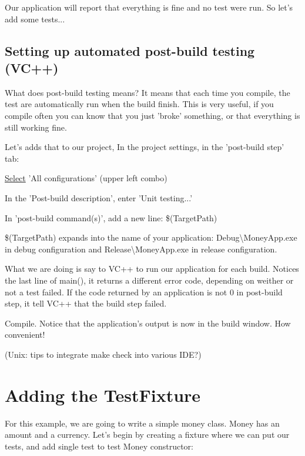 Our application will report that everything is fine and no test were run. So let's add some tests...\hypertarget{money_example_sec_post_build}{}\subsection{Setting up automated post-\/build testing (\+V\+C++)}\label{money_example_sec_post_build}
What does post-\/build testing means? It means that each time you compile, the test are automatically run when the build finish. This is very useful, if you compile often you can know that you just 'broke' something, or that everything is still working fine.

Let's adds that to our project, In the project settings, in the 'post-\/build step' tab\+:
\begin{DoxyItemize}
\item \hyperlink{struct_select}{Select} 'All configurations' (upper left combo)
\item In the 'Post-\/build description', enter 'Unit testing...'
\item In 'post-\/build command(s)', add a new line\+: {\ttfamily \$(Target\+Path)}
\end{DoxyItemize}

{\ttfamily \$(Target\+Path)} expands into the name of your application\+: Debug\textbackslash{}Money\+App.\+exe in debug configuration and Release\textbackslash{}Money\+App.\+exe in release configuration.

What we are doing is say to V\+C++ to run our application for each build. Notices the last line of {\ttfamily main()}, it returns a different error code, depending on weither or not a test failed. If the code returned by an application is not 0 in post-\/build step, it tell V\+C++ that the build step failed.

Compile. Notice that the application's output is now in the build window. How convenient!

(Unix\+: tips to integrate make check into various I\+D\+E?)\hypertarget{money_example_sec_adding_testfixture}{}\section{Adding the Test\+Fixture}\label{money_example_sec_adding_testfixture}
For this example, we are going to write a simple money class. Money has an amount and a currency. Let's begin by creating a fixture where we can put our tests, and add single test to test Money constructor\+:

